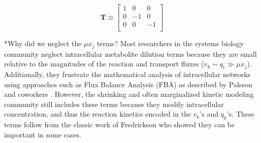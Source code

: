 \documentclass[11pt]{article}
\makeatletter
\theoremstyle{definition}
\renewcommand\subsubsection{\@startsection
	{subsubsection}{2}{0mm}
	{-0.05in}
	{-0.5\baselineskip}
	{\normalfont\normalsize\itshape}}
\makeatother
\begin{document}
	\begin{equation}\nonumber
		\mathbf{T} \equiv
		\begin{bmatrix}
			1 & 0 & 0 \\
			0 & -1 & 0 \\
			0 & 0 & -1 \\
		\end{bmatrix}
	\end{equation}

\subsubsection*{Why did we neglect the $\mu x_{j}$ terms?}
Most researchers in the systems biology community neglect intracellular metabolite dilution terms because they are small relative to the
magnitudes of the reaction and transport fluxes ($v_{k}\sim q_{t}\gg\mu x_{j}$).
Additionally, they frustrate the mathematical analysis of intracellular networks using
approaches such as Flux Balance Analysis (FBA) as described by Palsson and coworkers \citep{Orth:2010uq}.
However, the shrinking and often marginalized kinetic modeling community still includes these terms
because they modify intracellular concentration, and thus the reaction kinetics encoded in the $v_{k}$'s and $q_{k}$'s.
These terms follow from the classic work of Fredrickson \citep{Fredrickson:1976fk} who showed they can be important in some cases.
\end{document}
